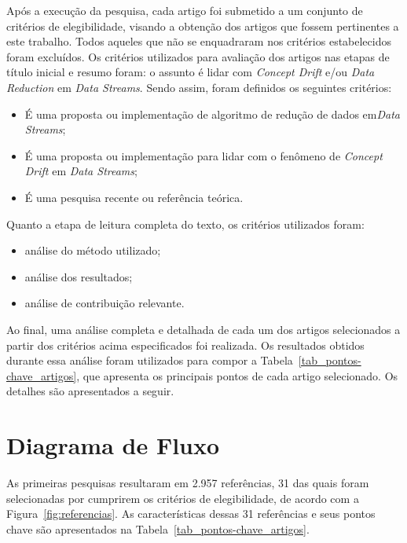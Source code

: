 Após a execução da pesquisa, cada artigo foi submetido a um conjunto de critérios de elegibilidade, visando a obtenção dos artigos que fossem pertinentes a este trabalho. Todos aqueles que não se enquadraram nos critérios estabelecidos foram excluídos. Os critérios utilizados para avaliação dos artigos nas etapas de título inicial e resumo foram: o assunto é lidar com \textit{Concept Drift} e/ou \textit{Data Reduction} em \textit{Data Streams}. Sendo assim, foram definidos os seguintes critérios:
\begin{itemize}
\item É uma proposta ou implementação de algoritmo de redução de dados em\textit{Data Streams};
\item É uma proposta ou implementação para lidar com o fenômeno de \textit{Concept Drift} em \textit{Data Streams};
\item É uma pesquisa recente ou referência teórica.
\end{itemize}

Quanto a etapa de leitura completa do texto, os critérios utilizados foram:

\begin{itemize}
\item análise do método utilizado;
\item análise dos resultados;
\item análise de contribuição relevante.
\end{itemize}

Ao final, uma análise completa e detalhada de cada um dos artigos selecionados a partir dos critérios acima especificados foi realizada. Os resultados obtidos durante essa análise foram utilizados para compor a Tabela~\ref{tab_pontos-chave_artigos}, que apresenta os principais pontos de cada artigo selecionado. Os detalhes são apresentados a seguir.

\section{Diagrama de Fluxo}\label{sec:prisma_diagrama} 

As primeiras pesquisas resultaram em 2.957 referências, 31 das quais foram selecionadas por cumprirem os critérios de elegibilidade, de acordo com a Figura~\ref{fig:referencias}. As características dessas 31 referências e seus pontos chave são apresentados na Tabela~\ref{tab_pontos-chave_artigos}. 




